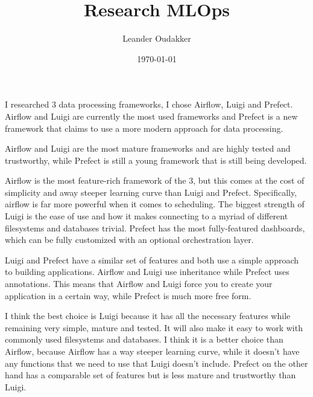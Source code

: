 \documentclass[12pt]{article}
\begin{document}
	
	\title{Research MLOps}
	\author{Leander Oudakker}
	\date{\today}
	
	
	\maketitle
	
	\newpage

I researched 3 data processing frameworks, I chose Airflow, Luigi and Prefect. Airflow and Luigi are currently the most used frameworks and Prefect is a new framework that claims to use a more modern approach for data processing.

Airflow and Luigi are the most mature frameworks and are highly tested and trustworthy, while Prefect is still a young framework that is still being developed.

Airflow is the most feature-rich framework of the 3, but this comes at the cost of simplicity and away steeper learning curve than Luigi and Prefect. Specifically, airflow is far more powerful when it comes to scheduling. The biggest strength of Luigi is the ease of use and how it makes connecting to a myriad of different filesystems and databases trivial. Prefect has the most fully-featured dashboards, which can be fully customized with an optional orchestration layer.

Luigi and Prefect have a similar set of features and both use a simple approach to building applications. Airflow and Luigi use inheritance while Prefect uses annotations. This means that Airflow and Luigi force you to create your application in a certain way, while Prefect is much more free form.

I think the best choice is Luigi because it has all the necessary features while remaining very simple, mature and tested. It will also make it easy to work with commonly used filesystems and databases. I think it is a better choice than Airflow, because Airflow has a way steeper learning curve, while it doesn't have any functions that we need to use that Luigi doesn't include. Prefect on the other hand has a comparable set of features but is less mature and trustworthy than Luigi.
\end{document}
